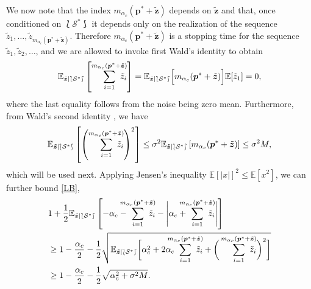\documentclass[12pt, draftclsnofoot, onecolumn]{IEEEtran}
\begin{document}
We now note that the index $m_{\alpha_c}(\boldsymbol{p}^*+\tilde{\boldsymbol{z}})$ depends on $\tilde{\boldsymbol{z}}$ and that, once conditioned on $\lbag\mathcal{S}^*\rbag$ it depends only on the realization of the sequence $\tilde{z}_1,\ldots,\tilde{z}_{m_{\alpha_c}(\boldsymbol{p}^*+\tilde{\boldsymbol{z}})}$. Therefore $m_{\alpha_c}(\boldsymbol{p}^*+\tilde{\boldsymbol{z}})$ is a stopping time for the sequence $\tilde{z}_1,\tilde{z}_2,\ldots$, and we are allowed to invoke first Wald's identity \cite{wald2004sequential} to obtain
\begin{equation}
    \mathbb{E}_{\tilde{\boldsymbol{z}}|\lbag\mathcal{S}^*\rbag}\left[\sum^{m_{\alpha_c}(\boldsymbol{p}^*+\tilde{\boldsymbol{z}})}_{i=1}\hspace{-1em}\tilde{z}_i\right]
    =\mathbb{E}_{\tilde{\boldsymbol{z}}|\lbag\mathcal{S}^*\rbag}\Big[m_{\alpha_c}(\boldsymbol{p}^*+\tilde{\boldsymbol{z}})\Big]\mathbb{E}[\tilde{z}_1]=0,
\end{equation}
where the last equality follows from the noise being zero mean. Furthermore, from Wald's second identity \cite{wald2004sequential}, we have 
\begin{equation}
    \mathbb{E}_{\tilde{\boldsymbol{z}}|\lbag\mathcal{S}^*\rbag}\left[\left(\sum^{m_{\alpha_c}(\boldsymbol{p}^*+\tilde{\boldsymbol{z}})}_{i=1}\hspace{-1em}\tilde{z}_i\right)^2\right]
    \leq \sigma^2 \mathbb{E}_{\tilde{\boldsymbol{z}}|\lbag\mathcal{S}^*\rbag}\left[m_{\alpha_c}(\boldsymbol{p}^*+\tilde{\boldsymbol{z}})\right]\leq \sigma^2M,
\end{equation}
which will be used next.
Applying Jensen's inequality $\mathbb{E}[|x|]^2\leq \mathbb{E}[x^2]$, we can further bound \eqref{LB},
\begin{align}\label{tight LB}
    &1+\frac{1}{2}\mathbb{E}_{\tilde{\boldsymbol{z}}|\lbag\mathcal{S}^*\rbag}\left[-\alpha_c - \hspace{-1em} \sum^{m_{\alpha_c}(\boldsymbol{p}^*+\tilde{\boldsymbol{z}})}_{i=1}\hspace{-1em}\tilde{z}_i-\Bigg|\alpha_c +\hspace{-1em} \sum^{m_{\alpha_c}(\boldsymbol{p}^* + \tilde{\boldsymbol{z}})}_{i=1}\hspace{-1em}\tilde{z}_i\Bigg|\right] \nonumber\\
    & \geq 1 - \frac{\alpha_c}{2}-\frac{1}{2}\sqrt{\mathbb{E}_{\tilde{\boldsymbol{z}}|\lbag\mathcal{S}^*\rbag}\bigg[\alpha_c^2 + 2\alpha_c \hspace{-1em}\sum^{m_{\alpha_c}(\boldsymbol{p}^* + \tilde{\boldsymbol{z}})}_{i=1}\hspace{-1em}\tilde{z}_i+ \bigg(\sum^{m_{\alpha_c}(\boldsymbol{p}^* + \tilde{\boldsymbol{z}})}_{i=1}\hspace{-1em}\tilde{z}_i\bigg)^2\bigg]} \nonumber\\
    &\geq 1 - \frac{\alpha_c}{2}-\frac{1}{2}\sqrt{\alpha_c^2 + \sigma^2M}.
\end{align}
\end{document}
